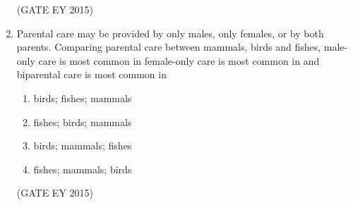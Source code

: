 \documentclass[journal,12pt,onecolumn]{IEEEtran}
\theoremstyle{remark}
\begin{document}
\begin{enumerate}
\begin{enumerate}
    \end{enumerate}
    
\hfill{(GATE EY 2015)}




\item 
Parental care may be provided by only males, only females, or by both parents. Comparing parental care between mammals, birds and fishes, male-only care is most common in  female-only care is most common in  \underline{\hspace{2cm}} and biparental care is most common in  \underline{\hspace{2cm}} 
\begin{multicols}{2}
\begin{enumerate}
    
\item  birds; fishes; mammals
\item fishes; birds; mammals
\item birds; mammals; fishes
\item fishes; mammals; birds
    \end{enumerate}
    \end{multicols}
\hfill{(GATE EY 2015)}




\end{enumerate}
\end{document}
